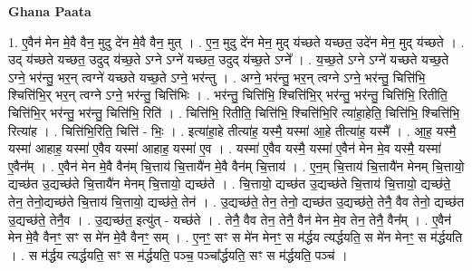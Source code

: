 \documentclass[17pt]{extarticle}
\begin{document}
\textbf{Ghana Paata } \newline

1. ए॒वैन॑ मेन मे॒वै वैन॒ मुदु दे॑न मे॒वै वैन॒ मुत् । . ए॒न॒ मुदु दे॑न मेन॒ मुद् य॑च्छते यच्छत॒ उदे॑न मेन॒ मुद् य॑च्छते । . उद् य॑च्छते यच्छत॒ उदुद् य॑च्छ॒ते ऽग्ने ऽग्ने॑ यच्छत॒ उदुद् य॑च्छ॒ते ऽग्ने᳚ । . य॒च्छ॒ते ऽग्ने ऽग्ने॑ यच्छते यच्छ॒ते ऽग्ने॒ भर॑न्तु॒ भर॒न् त्वग्ने॑ यच्छते यच्छ॒ते ऽग्ने॒ भर॑न्तु । . अग्ने॒ भर॑न्तु॒ भर॒न् त्वग्ने ऽग्ने॒ भर॑न्तु॒ चित्ति॑भि॒ श्चित्ति॑भि॒र् भर॒न् त्वग्ने ऽग्ने॒ भर॑न्तु॒ चित्ति॑भिः । . भर॑न्तु॒ चित्ति॑भि॒ श्चित्ति॑भि॒र् भर॑न्तु॒ भर॑न्तु॒ चित्ति॑भि॒ रितीति॒ चित्ति॑भि॒र् भर॑न्तु॒ भर॑न्तु॒ चित्ति॑भि॒ रिति॑ । . चित्ति॑भि॒ रितीति॒ चित्ति॑भि॒ श्चित्ति॑भि॒रि त्या॑हा॒हेति॒ चित्ति॑भि॒ श्चित्ति॑भि॒ रित्या॑ह । . चित्ति॑भि॒रिति॒ चित्ति॑ - भिः॒ । . इत्या॑हा॒हे तीत्या॑ह॒ यस्मै॒ यस्मा॑ आ॒हे तीत्या॑ह॒ यस्मै᳚ । . आ॒ह॒ यस्मै॒ यस्मा॑ आहाह॒ यस्मा॑ ए॒वैव यस्मा॑ आहाह॒ यस्मा॑ ए॒व । . यस्मा॑ ए॒वैव यस्मै॒ यस्मा॑ ए॒वैन॑ मेन मे॒व यस्मै॒ यस्मा॑ ए॒वैन᳚म् । . ए॒वैन॑ मेन मे॒वै वैन॑म् चि॒त्ताय॑ चि॒त्तायै॑न मे॒वै वैन॑म् चि॒त्ताय॑ । . ए॒न॒म् चि॒त्ताय॑ चि॒त्तायै॑न मेनम् चि॒त्तायो॒ द्यच्छ॑त उ॒द्यच्छ॑ते चि॒त्तायै॑न मेनम् चि॒त्तायो॒ द्यच्छ॑ते । . चि॒त्तायो॒ द्यच्छ॑त उ॒द्यच्छ॑ते चि॒त्ताय॑ चि॒त्तायो॒ द्यच्छ॑ते॒ तेन॒ तेनो॒द्यच्छ॑ते चि॒त्ताय॑ चि॒त्तायो॒ द्यच्छ॑ते॒ तेन॑ । . उ॒द्यच्छ॑ते॒ तेन॒ तेनो॒ द्यच्छ॑त उ॒द्यच्छ॑ते॒ तेनै॒ वैव तेनो॒ द्यच्छ॑त उ॒द्यच्छ॑ते॒ तेनै॒व । . उ॒द्यच्छ॑त॒ इत्यु॑त् - यच्छ॑ते । . तेनै॒ वैव तेन॒ तेनै॒ वैन॑ मेन मे॒व तेन॒ तेनै॒ वैन᳚म् । . ए॒वैन॑ मेन मे॒वै वैनꣳ॒॒ सꣳ स मे॑न मे॒वै वैनꣳ॒॒ सम् । . ए॒नꣳ॒॒ सꣳ स मे॑न मेनꣳ॒॒ स म॑र्द्धय त्यर्द्धयति॒ स मे॑न मेनꣳ॒॒ स म॑र्द्धयति । . स म॑र्द्धय त्यर्द्धयति॒ सꣳ स म॑र्द्धयति॒ पञ्च॒ पञ्चा᳚र्द्धयति॒ सꣳ स म॑र्द्धयति॒ पञ्च॑ । \newline
\end{document}
